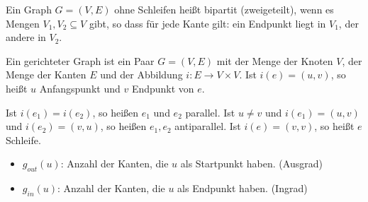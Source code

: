 \begin{definition}
    
    Ein Graph $G = (V, E)$ ohne Schleifen heißt bipartit (zweigeteilt), wenn es
    Mengen $V_1, V_2 \subseteq V$ gibt, so dass für jede Kante gilt: ein
    Endpunkt liegt in $V_1$, der andere in $V_2$.
\end{definition}


\begin{beispiel}
    \qquad
    \vspace{2mm}
    
\end{beispiel}


\begin{definition}

    Ein gerichteter Graph ist ein Paar $G = (V, E)$ mit der Menge der Knoten
    $V$, der Menge der Kanten $E$ und der Abbildung $i: E \rightarrow V \times
    V$. Ist $i(e) = (u, v)$, so heißt $u$ Anfangspunkt und $v$ Endpunkt von
    $e$.
    
    Ist $i(e_1) = i(e_2)$, so heißen $e_1$ und $e_2$ parallel. Ist $u \ne v$
    und $i(e_1) = (u, v)$ und $i(e_2) = (v, u)$, so heißen $e_1, e_2$
    antiparallel. Ist $i(e) = (v, v)$, so heißt $e$ Schleife.
    
    \begin{itemize}
        \item $g_{out}(u)$: Anzahl der Kanten, die $u$ als Startpunkt haben. (Ausgrad)
        \item $g_{in}(u)$: Anzahl der Kanten, die $u$ als Endpunkt haben. (Ingrad)
    \end{itemize}
\end{definition}


